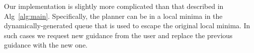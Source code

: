 \documentclass[conference]{IEEEtran}
\begin{document}
Our implementation is slightly more complicated than that described in Alg~\ref{alg:main}.
Specifically, the planner can be in a local minima in the dynamically-generated queue that is used to escape the original local minima. 
In such cases we request new guidance from the user and replace the previous guidance with the new one.

\begin{figure}[t]%
  \centering%
\end{figure}
\end{document}
